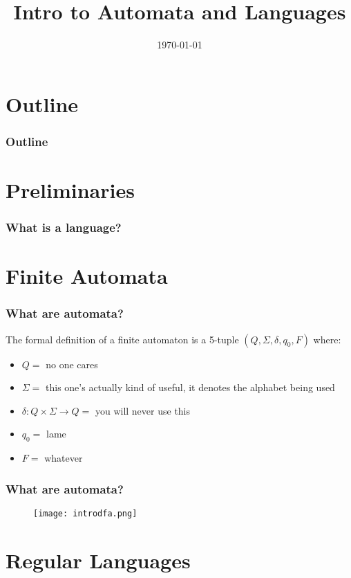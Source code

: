 \documentclass{beamer}
\title{Intro to Automata and Languages}
\institute[]{An hour-long explanation of Dave's ``Well actually"}
\date{\today}
\begin{document}
\begin{frame}
	\titlepage
\end{frame}

\section*{Outline}
\begin{frame}
	\frametitle{Outline}
	\tableofcontents

\end{frame}

\section*{Preliminaries}
\begin{frame}
	\frametitle{What is a language?}
	

\end{frame}

\section*{Finite Automata}
\begin{frame}
	\frametitle{What are automata?}
	The formal definition of a finite automaton is a 5-tuple 
	$(Q, \Sigma, \delta, q_0, F)$ where:
	
	\begin{itemize}
	\item $Q = $ no one cares
	\item $\Sigma = $ this one's actually kind of useful, it denotes the alphabet being used
	\item $\delta: Q \times \Sigma \rightarrow Q  = $ you will never use this 
	\item $q_0 = $  lame
	\item $F = $ whatever
	\end{itemize}
	
\end{frame}

\begin{frame}
	\frametitle{What are automata?}

	\begin{figure}
		\texttt{[image: introdfa.png]}
	\end{figure}	
\end{frame}


\section*{Regular Languages}
\end{document}
